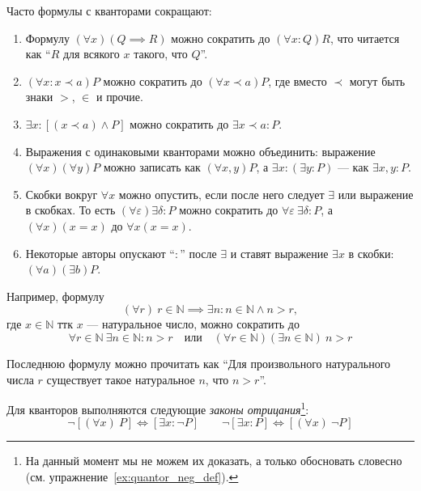 Часто формулы с кванторами сокращают:
\begin{fullwidth}
	\begin{multicols}{2}
		\begin{enumerate}
			\item{}Формулу ${(\forall x)(Q\implies R)}$ можно сократить
			до ${(\forall x:Q)R}$, что читается как ``$R$ для всякого $x$ такого, что
			$Q$''.

			\item{}${(\forall x:x\prec a)P}$ можно сократить до ${(\forall x\prec a)P}$,
			где вместо $\prec$ могут быть знаки $>$, $\in$ и прочие.

			\item{}$\exists x:[(x\prec a)\land P]$ можно сократить
			до $\exists x\prec a:P$.

			\item{}Выражения с одинаковыми кванторами можно объединить:
			выражение $(\forall x)(\forall y)P$ можно записать как $(\forall x,y)P$,
			а ${\exists x:(\exists y:P)}$ --- как $\exists x,y:P$.

			\columnbreak

			\item{}Скобки вокруг $\forall x$ можно опустить,
			если после него следует $\exists$ или выражение в скобках.
			То есть ${(\forall \varepsilon)\exists \delta:P}$
			можно сократить до $\forall \varepsilon~\exists \delta:P$,
			а $(\forall x)(x=x)$ до $\forall x(x=x)$.

			\item{}Некоторые авторы опускают ``$:$'' после $\exists$ и
			ставят выражение $\exists x$ в скобки: $(\forall a)(\exists b)P$.
		\end{enumerate}
	\end{multicols}
\end{fullwidth}

Например, формулу
\newcommand\N{\mathbb N}
\[
	(\forall r)~r\in\N\implies \exists n:n\in\N\land n>r,
\]
где $x\in\N$ ттк $x$ --- натуральное число, можно сократить до
\[
	\forall r\in\N~\exists n\in\N:n>r\quad\text{или}\quad
	(\forall r\in\N)(\exists n\in\N)~n>r
\]

Последнюю формулу можно прочитать как ``Для произвольного натурального числа
$r$ существует такое натуральное $n$, что $n>r$''.

Для кванторов выполняются следующие {\it законы отрицания}\footnote{
	На данный момент мы не можем их доказать, а только
	обосновать словесно (см. упражнение~\ref{ex:quantor_neg_def}).
}:
\[
	\lnot[(\forall x)~P]\iff[\exists x:\lnot P]\qquad
	\lnot[\exists x:P]\iff[(\forall x)~\lnot P]
\]

